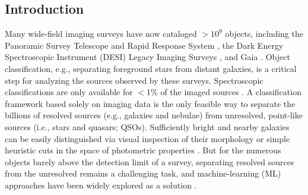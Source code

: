 \documentclass[twocolumn]{aastex631}
\begin{document}
\begin{CJK*}{UTF8}{gbsn}

\section{Introduction} \label{sec:intro}

Many wide-field imaging surveys have now cataloged $>$$10^9$ objects, including the Panoramic Survey Telescope and Rapid Response System \citep[Pan-STARRS;][]{PanSTARRS_2016}, the Dark Energy Spectroscopic Instrument (DESI) Legacy Imaging Surveys \citep[LS;][]{LS_2019}, and Gaia \citep{Gaia_2016,GaiaDR3_2023}. Object classification, e.g., separating foreground stars from distant galaxies, is a critical step for analyzing the sources observed by these surveys. Spectroscopic classifications are only available for $<$1\% of the imaged sources \citep{DESI_DR1_2025}. A classification framework based solely on imaging data is the only feasible way to separate the billions of resolved sources (e.g., galaxies and nebulae) from unresolved, point-like sources (i.e., stars and quasars; QSOs). Sufficiently bright and nearby galaxies can be easily distinguished via visual inspection of their morphology \citep{Lintott_2008} or simple heuristic cuts in the space of photometric properties \citep[e.g.,][]{Kron_1980, Leauthaud_2007}. But for the numerous objects barely above the detection limit of a survey, separating resolved sources from the unresolved remains a challenging task, and machine-learning (ML) approaches have been widely explored as a solution \citep[e.g., \citealp{Bertin_1996,Philip_2002, Ball_2006, Henrion_2011, Vasconcellos_2011, Kovacs_2015, Miller_2017, Tachibana_2018, Stoppa_2023, Miller_2021, Beck_2022}; see][for a comprehensive review]{Sevilla-Noarbe_2018}.


\end{CJK*}
\end{document}
